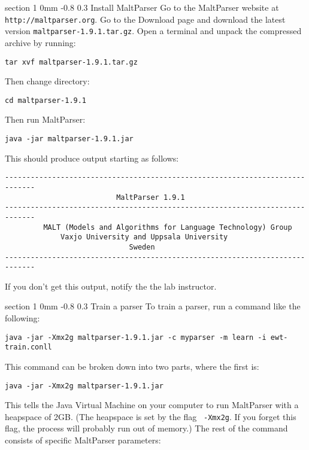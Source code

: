 \documentclass[10.9pt]{article}
\makeatletter
\newcommand{\newsec}[2]{\section{#1}\label{sec:#2}\noindent}
\renewcommand{\section}{\@startsection
{section}%
{1}%
{0mm}%
{-0.8\baselineskip}%
{0.3\baselineskip}%
{\bfseries\large}}%
\makeatother
\begin{document}
\newsec{Install MaltParser}{malt}%
Go to the MaltParser website at {\tt http://maltparser.org}. Go to the Download page and download the latest version {\tt maltparser-1.9.1.tar.gz}. Open a terminal and unpack the compressed archive by running:
\begin{small}
\begin{verbatim}
tar xvf maltparser-1.9.1.tar.gz
\end{verbatim}
\end{small}
Then change directory:
\begin{small}
\begin{verbatim}
cd maltparser-1.9.1
\end{verbatim}
\end{small}
Then run MaltParser:
\begin{small}
\begin{verbatim}
java -jar maltparser-1.9.1.jar
\end{verbatim}
\end{small}
This should produce output starting as follows:
\begin{small}
\begin{verbatim}
-----------------------------------------------------------------------------
                          MaltParser 1.9.1                             
-----------------------------------------------------------------------------
         MALT (Models and Algorithms for Language Technology) Group          
             Vaxjo University and Uppsala University                         
                             Sweden                                          
-----------------------------------------------------------------------------
\end{verbatim}
\end{small}
If you don't get this output, notify the the lab instructor.

\newsec{Train a parser}{train}%
To train a parser, run a command like the following:
\begin{small}
\begin{verbatim}
java -jar -Xmx2g maltparser-1.9.1.jar -c myparser -m learn -i ewt-train.conll 
\end{verbatim}
\end{small}
This command can be broken down into two parts, where the first is:
\begin{small}
\begin{verbatim}
java -jar -Xmx2g maltparser-1.9.1.jar
\end{verbatim}
\end{small}
This tells the Java Virtual Machine on your computer to run MaltParser
with a heapspace of 2GB. (The heapspace is set by the flag {\tt
  -Xmx2g}. If you forget this flag, the process will probably run out
of memory.)  The rest of the command consists of specific MaltParser
parameters:
\end{document}
